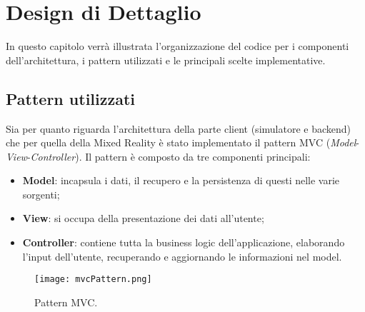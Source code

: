 
\chapter{Design di Dettaglio}
\label{chap:detailed-design}
In questo capitolo verrà illustrata l'organizzazione del codice per i componenti dell'architettura, i pattern utilizzati e le principali scelte implementative.

\section{Pattern utilizzati}
Sia per quanto riguarda l'architettura della parte client (simulatore e backend) che per quella della Mixed Reality è stato implementato il pattern MVC (\textit{Model}-\textit{View}-\textit{Controller}). Il pattern è composto da tre componenti principali:

\begin{itemize}
    \item \textbf{Model}: incapsula i dati, il recupero e la persistenza di questi nelle varie sorgenti;
    \item \textbf{View}: si occupa della presentazione dei dati all'utente;
    \item \textbf{Controller}: contiene tutta la business logic dell'applicazione, elaborando l'input dell'utente, recuperando e aggiornando le informazioni nel model.
\end{itemize}

\begin{wrapfigure}{r}{0.4\textwidth}
    \centering
    \texttt{[image: mvcPattern.png]}
    \caption{\label{pic:mvc-pattern} Pattern MVC.}
\end{wrapfigure}


